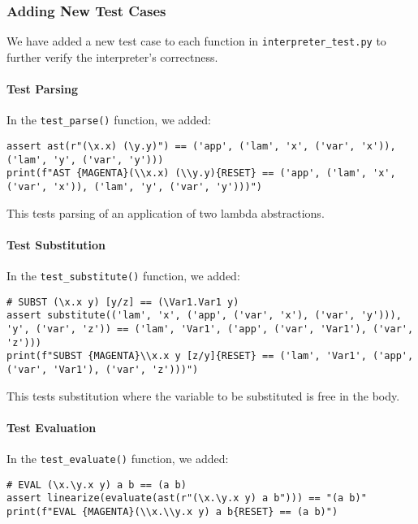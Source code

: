 \documentclass{article}
\theoremstyle{theorem}
\theoremstyle{definition}
\theoremstyle{remark}
\begin{document}
\subsubsection{Adding New Test Cases}

We have added a new test case to each function in \texttt{interpreter\_test.py} to further verify the interpreter's correctness.

\paragraph{Test Parsing}

In the \texttt{test\_parse()} function, we added:

\begin{verbatim}
assert ast(r"(\x.x) (\y.y)") == ('app', ('lam', 'x', ('var', 'x')), ('lam', 'y', ('var', 'y')))
print(f"AST {MAGENTA}(\\x.x) (\\y.y){RESET} == ('app', ('lam', 'x', ('var', 'x')), ('lam', 'y', ('var', 'y')))")
\end{verbatim}

This tests parsing of an application of two lambda abstractions.

\paragraph{Test Substitution}

In the \texttt{test\_substitute()} function, we added:

\begin{verbatim}
# SUBST (\x.x y) [y/z] == (\Var1.Var1 y)
assert substitute(('lam', 'x', ('app', ('var', 'x'), ('var', 'y'))), 'y', ('var', 'z')) == ('lam', 'Var1', ('app', ('var', 'Var1'), ('var', 'z')))
print(f"SUBST {MAGENTA}\\x.x y [z/y]{RESET} == ('lam', 'Var1', ('app', ('var', 'Var1'), ('var', 'z')))")
\end{verbatim}

This tests substitution where the variable to be substituted is free in the body.

\paragraph{Test Evaluation}

In the \texttt{test\_evaluate()} function, we added:

\begin{verbatim}
# EVAL (\x.\y.x y) a b == (a b)
assert linearize(evaluate(ast(r"(\x.\y.x y) a b"))) == "(a b)"
print(f"EVAL {MAGENTA}(\\x.\\y.x y) a b{RESET} == (a b)")
\end{verbatim}
\end{document}

